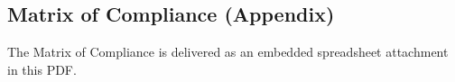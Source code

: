 \subsection*{Matrix of Compliance (Appendix)}
\label{app:matrix-compliance-xlsx}

The Matrix of Compliance is delivered as an embedded spreadsheet attachment in this PDF.

